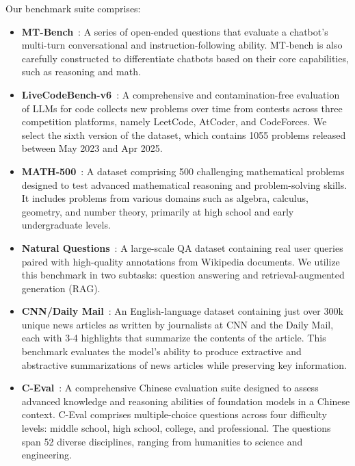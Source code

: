 \documentclass{article} %
\begin{document}
Our benchmark suite comprises:
\begin{itemize}
    \item \textbf{MT-Bench}~\citep{zheng2023judging}: A series of open-ended questions that evaluate a chatbot’s multi-turn conversational and instruction-following ability. MT-bench is also carefully constructed to differentiate chatbots based on their core capabilities, such as reasoning and math.
    
    \item \textbf{LiveCodeBench-v6}~\citep{jain2024livecodebench}: A comprehensive and contamination-free evaluation of LLMs for code collects new problems over time from contests across three competition platforms, namely LeetCode, AtCoder, and CodeForces. We select the sixth version of the dataset, which contains 1055 problems released between May 2023 and Apr 2025.
    
    \item \textbf{MATH-500}~\citep{lightman2023lets}: A dataset comprising 500 challenging mathematical problems designed to test advanced mathematical reasoning and problem-solving skills. It includes problems from various domains such as algebra, calculus, geometry, and number theory, primarily at high school and early undergraduate levels. 
    
    \item \textbf{Natural Questions}~\citep{kwiatkowski2019natural}: A large-scale QA dataset containing real user queries paired with high-quality annotations from Wikipedia documents. We utilize this benchmark in two subtasks: question answering and retrieval-augmented generation (RAG).
    
    \item \textbf{CNN/Daily Mail}~\citep{nallapati2016abstractive}: An English-language dataset containing just over 300k unique news articles as written by journalists at CNN and the Daily Mail, each with 3-4 highlights that summarize the contents of the article. This benchmark evaluates the model's ability to produce extractive and abstractive summarizations of news articles while preserving key information.
    
    \item \textbf{C-Eval}~\citep{huang2023ceval}: A comprehensive Chinese evaluation suite designed to assess advanced knowledge and reasoning abilities of foundation models in a Chinese context. C-Eval comprises multiple-choice questions across four difficulty levels: middle school, high school, college, and professional. The questions span 52 diverse disciplines, ranging from humanities to science and engineering. 
\end{itemize}
\end{document}
